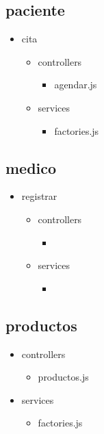 	\subsection{paciente}
		\begin{itemize}
		\item cita
		\begin{itemize}
			\item controllers
			\begin{itemize}
				\item agendar.js
			\end{itemize}
			\item services
			\begin{itemize}
				\item factories.js
			\end{itemize}
		\end{itemize}
	\end{itemize}
	\subsection{medico}
		\begin{itemize}
		\item registrar
		\begin{itemize}
			\item controllers
			\begin{itemize}
				\item
			\end{itemize}
			\item services
			\begin{itemize}
				\item
			\end{itemize}
		\end{itemize}
	\end{itemize}
	\subsection{productos}
		\begin{itemize}
			\item controllers
			\begin{itemize}
				\item productos.js
			\end{itemize}
			\item services
			\begin{itemize}
				\item factories.js
			\end{itemize}
		\end{itemize}
	
